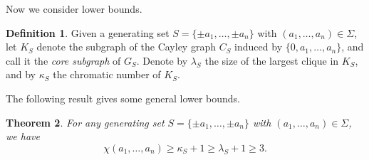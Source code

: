 \documentclass[11pt]{amsart}
\newtheorem{theorem}{Theorem}[section]
\theoremstyle{definition}
\newtheorem{definition}[theorem]{Definition}
\begin{document}
Now we consider lower bounds. 

\begin{definition} Given a generating set $S=\{\pm a_1,\dots, \pm a_n\}$ with $(a_1,\dots, a_n)\in \Sigma$, let $K_S$ denote the subgraph of the Cayley graph $C_S$ induced by $\{0, a_1,\dots, a_n\}$, and call it the {\em core subgraph} of $G_S$. Denote by $\lambda_S$ the size of the largest clique in $K_S$, and by $\kappa_S$ the chromatic number of $K_S$.
\end{definition}

The following result gives some general lower bounds.

\begin{theorem}\label{thm:lower} For any generating set $S=\{\pm a_1,\dots, \pm a_n\}$ with $(a_1,\dots, a_n)\in \Sigma$, we have
$$\chi(a_1,\dots, a_n)\geq \kappa_S+1\geq \lambda_S+1\geq 3. $$
\end{theorem}
\end{document}
